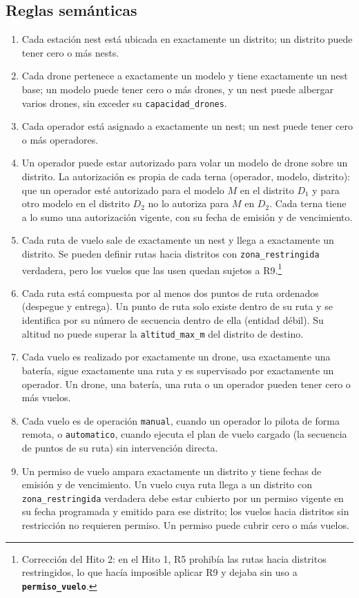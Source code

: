 \documentclass[11pt,a4paper]{article}
\newcommand{\tb}[1]{\textbf{\texttt{#1}}}
\newcommand{\at}[1]{\texttt{#1}}
\begin{document}
\subsection{Reglas semánticas}
\begin{enumerate}[label=\textbf{R\arabic*.}, leftmargin=*]
\item Cada estación nest está ubicada en exactamente un distrito; un distrito puede tener cero o más nests.
\item Cada drone pertenece a exactamente un modelo y tiene exactamente un nest base; un modelo puede tener cero o más drones, y un nest puede albergar varios drones, sin exceder su \at{capacidad\_drones}.
\item Cada operador está asignado a exactamente un nest; un nest puede tener cero o más operadores.
\item Un operador puede estar autorizado para volar un modelo de drone sobre un distrito. La autorización es propia de cada terna (operador, modelo, distrito): que un operador esté autorizado para el modelo $M$ en el distrito $D_1$ y para otro modelo en el distrito $D_2$ no lo autoriza para $M$ en $D_2$. Cada terna tiene a lo sumo una autorización vigente, con su fecha de emisión y de vencimiento.
\item Cada ruta de vuelo sale de exactamente un nest y llega a exactamente un distrito. Se pueden definir rutas hacia distritos con \at{zona\_restringida} verdadera, pero los vuelos que las usen quedan sujetos a R9.\footnote{Corrección del Hito 2: en el Hito 1, R5 prohibía las rutas hacia distritos restringidos, lo que hacía imposible aplicar R9 y dejaba sin uso a \tb{permiso\_vuelo}.}
\item Cada ruta está compuesta por al menos dos puntos de ruta ordenados (despegue y entrega). Un punto de ruta solo existe dentro de su ruta y se identifica por su número de secuencia dentro de ella (entidad débil). Su altitud no puede superar la \at{altitud\_max\_m} del distrito de destino.
\item Cada vuelo es realizado por exactamente un drone, usa exactamente una batería, sigue exactamente una ruta y es supervisado por exactamente un operador. Un drone, una batería, una ruta o un operador pueden tener cero o más vuelos.
\item Cada vuelo es de operación \at{manual}, cuando un operador lo pilota de forma remota, o \at{automatico}, cuando ejecuta el plan de vuelo cargado (la secuencia de puntos de su ruta) sin intervención directa.
\item Un permiso de vuelo ampara exactamente un distrito y tiene fechas de emisión y de vencimiento. Un vuelo cuya ruta llega a un distrito con \at{zona\_restringida} verdadera debe estar cubierto por un permiso vigente en su fecha programada y emitido para ese distrito; los vuelos hacia distritos sin restricción no requieren permiso. Un permiso puede cubrir cero o más vuelos.

\end{enumerate}
\end{document}
